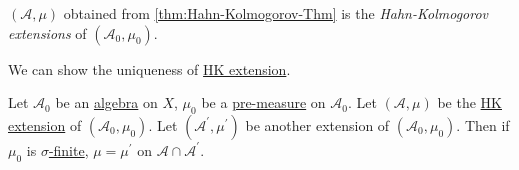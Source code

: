 \begin{definition}[HK extension]\label{def:HK-extension}
	\((\mathcal{A} , \mu )\) obtained from \autoref{thm:Hahn-Kolmogorov-Thm} is the \emph{Hahn-Kolmogorov extensions} of \((\mathcal{A} _0, \mu _0)\).
\end{definition}

We can show the uniqueness of \hyperref[def:HK-extension]{HK extension}.

\begin{theorem}\label{thm:uniqueness-of-HK-extension}
	Let \(\mathcal{A}_0\) be an \hyperref[def:algebra]{algebra} on \(X\), \(\mu _0\) be a \hyperref[def:pre-measure]{pre-measure} on \(\mathcal{A} _0\). Let \((\mathcal{A} , \mu)\)
	be the \hyperref[def:HK-extension]{HK extension} of \((\mathcal{A} _0, \mu _0)\). Let \((\mathcal{A} ^\prime , \mu ^\prime )\) be another extension of \((\mathcal{A} _0, \mu _0)\).
	Then if \(\mu _0\) is \hyperref[def:finite-measure]{\(\sigma\)-finite}, \(\mu  = \mu ^\prime \) on \(\mathcal{A} \cap \mathcal{A} ^\prime \).
\end{theorem}
